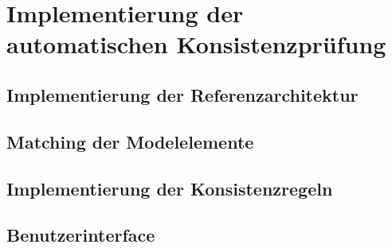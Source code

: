 \chapter{Implementierung der automatischen Konsistenzprüfung}

\section{Implementierung der Referenzarchitektur}

\section{Matching der Modelelemente}

\section{Implementierung der Konsistenzregeln}

\section{Benutzerinterface}